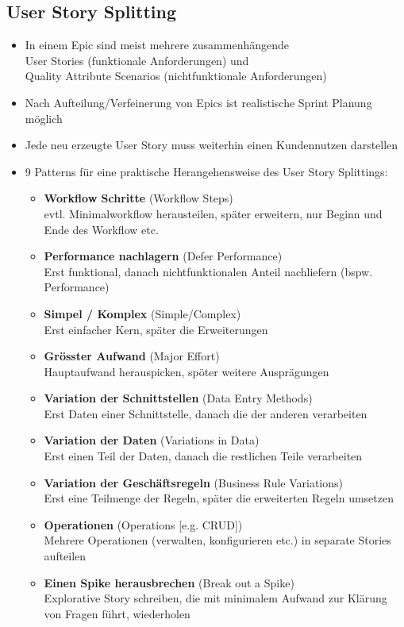 \documentclass[a4paper]{article}
\begin{document}
		\subsection{User Story Splitting}
		
		\begin{itemize}
			\item In einem Epic sind meist mehrere zusammenhängende\\
			User Stories (funktionale Anforderungen) und \\
			Quality Attribute Scenarios (nichtfunktionale Anforderungen)
			\item Nach Aufteilung/Verfeinerung von Epics ist realistische Sprint Planung möglich
			\item Jede neu erzeugte User Story muss weiterhin einen Kundennutzen darstellen
			\item 9 Patterns für eine praktische Herangehensweise des User Story Splittings:
				\begin{itemize}
					\item \textbf{Workflow Schritte} (Workflow Steps)\\
					evtl. Minimalworkflow herausteilen, später erweitern, nur Beginn und Ende des Workflow etc.
					\item \textbf{Performance nachlagern} (Defer Performance)\\
					Erst funktional, danach nichtfunktionalen Anteil nachliefern (bspw. Performance)
					\item \textbf{Simpel / Komplex} (Simple/Complex)\\
					Erst einfacher Kern, später die Erweiterungen
					\item \textbf{Grösster Aufwand} (Major Effort)\\
					Hauptaufwand herauspicken, spöter weitere Ausprägungen
					\item \textbf{Variation der Schnittstellen} (Data Entry Methods)\\
					Erst Daten einer Schnittstelle, danach die der anderen verarbeiten
					\item \textbf{Variation der Daten} (Variations in Data)\\
					Erst einen Teil der Daten, danach die restlichen Teile verarbeiten
					\item \textbf{Variation der Geschäftsregeln} (Business Rule Variations)\\
					Erst eine Teilmenge der Regeln, später die erweiterten Regeln umsetzen
					\item \textbf{Operationen} (Operations [e.g. CRUD])\\
					Mehrere Operationen (verwalten, konfigurieren etc.) in separate Stories aufteilen
					\item \textbf{Einen Spike herausbrechen} (Break out a Spike)\\
					Explorative Story schreiben, die mit minimalem Aufwand zur Klärung von Fragen führt, wiederholen
				\end{itemize}
		\end{itemize}
	
\end{document}
